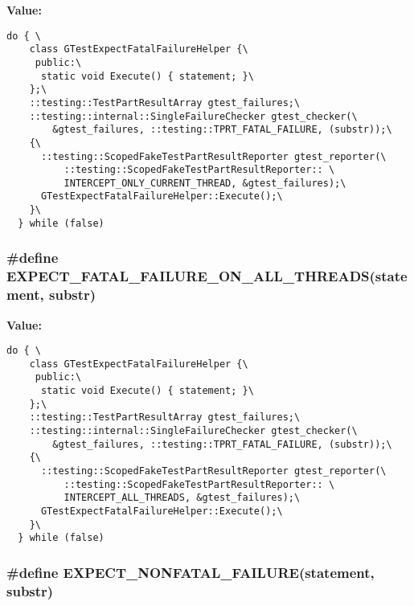 \textbf{Value:}

\begin{Code}\begin{verbatim}do { \
    class GTestExpectFatalFailureHelper {\
     public:\
      static void Execute() { statement; }\
    };\
    ::testing::TestPartResultArray gtest_failures;\
    ::testing::internal::SingleFailureChecker gtest_checker(\
        &gtest_failures, ::testing::TPRT_FATAL_FAILURE, (substr));\
    {\
      ::testing::ScopedFakeTestPartResultReporter gtest_reporter(\
          ::testing::ScopedFakeTestPartResultReporter:: \
          INTERCEPT_ONLY_CURRENT_THREAD, &gtest_failures);\
      GTestExpectFatalFailureHelper::Execute();\
    }\
  } while (false)
\end{verbatim}
\end{Code}
\subsubsection{\setlength{\rightskip}{0pt plus 5cm}\#define EXPECT\_\-FATAL\_\-FAILURE\_\-ON\_\-ALL\_\-THREADS(statement, substr)}\label{gtest-spi_8h_1918b596228181d663d8ef8975dcf919}


\textbf{Value:}

\begin{Code}\begin{verbatim}do { \
    class GTestExpectFatalFailureHelper {\
     public:\
      static void Execute() { statement; }\
    };\
    ::testing::TestPartResultArray gtest_failures;\
    ::testing::internal::SingleFailureChecker gtest_checker(\
        &gtest_failures, ::testing::TPRT_FATAL_FAILURE, (substr));\
    {\
      ::testing::ScopedFakeTestPartResultReporter gtest_reporter(\
          ::testing::ScopedFakeTestPartResultReporter:: \
          INTERCEPT_ALL_THREADS, &gtest_failures);\
      GTestExpectFatalFailureHelper::Execute();\
    }\
  } while (false)
\end{verbatim}
\end{Code}
\subsubsection{\setlength{\rightskip}{0pt plus 5cm}\#define EXPECT\_\-NONFATAL\_\-FAILURE(statement, substr)}\label{gtest-spi_8h_451fa59ec46dc912081a08e1eb4fca99}


